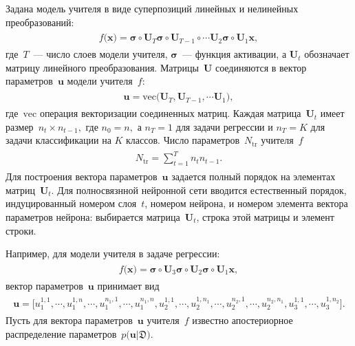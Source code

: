 \documentclass[12pt]{a&t}
\begin{document}
Задана модель учителя в виде суперпозиций линейных и нелинейных преобразований:
\begin{gather}
\label{eq:st:2}
\begin{aligned}
f\bigr(\mathbf{x}\bigr) = \bm{\sigma} \circ \mathbf{U}_T \bm{\sigma} \circ \mathbf{U}_{T-1}\circ \cdots  \mathbf{U}_2\bm{\sigma} \circ \mathbf{U}_1\mathbf{x},
\end{aligned}
\end{gather}
где~$T$~--- число слоев модели учителя, $\bm{\sigma}$~--- функция активации, а $\mathbf{U}_t$ обозначает матрицу линейного преобразования. Матрицы~$\mathbf{U}$ соединяются в вектор параметров~$\mathbf{u}$ модели учителя~$f$:
\begin{gather}
\label{eq:st:2.1}
\begin{aligned}
\mathbf{u} = \text{vec}\bigr(\mathbf{U}_T, \mathbf{U}_{T-1}, \cdots \mathbf{U}_1\bigr),
\end{aligned}
\end{gather}
где~$\text{vec}$ операция векторизации соединенных матриц.
Каждая матрица~$\mathbf{U}_t$ имеет размер~$n_t\times n_{t-1},$ где $n_0=n,$ а  $n_T={1}$ для задачи регрессии и $n_T=K$ для задачи классификации на $K$ классов. Число параметров~$N_{\text{tr}}$ учителя~$f$
\begin{gather}
\label{eq:st:2.2}
\begin{aligned}
N_{\text{tr}} = \sum_{t=1}^{T}n_tn_{t-1}.
\end{aligned}
\end{gather}
Для построения вектора параметров~$\mathbf{u}$ задается полный порядок на элементах матриц~$\mathbf{U}_t$. Для полносвязнной нейронной сети вводится естественный порядок, индуцированный номером слоя~$t$, номером нейрона, и номером элемента вектора параметров нейрона: выбирается матрица~$\mathbf{U}_t$, строка этой матрицы и элемент строки.

Например, для модели учителя в задаче регрессии:
\begin{gather}
\label{eq:st:3}
\begin{aligned}
f\bigr(\mathbf{x}\bigr) = \bm{\sigma} \circ \mathbf{U}_3 \bm{\sigma} \circ \mathbf{U}_2\bm{\sigma}\circ \mathbf{U}_1\mathbf{x},
\end{aligned}
\end{gather}
вектор параметров~$\mathbf{u}$ принимает вид
\begin{gather}
\label{eq:st:4}
\begin{aligned}
\mathbf{u} = \bigr[u_1^{1,1}, \cdots, u_1^{1,n},
                                               \cdots, 
                             u_1^{n_1,1}, \cdots, u_1^{n_1,n},  
                             u_2^{1, 1}, \cdots, u_2^{1, n_1}, 
                                                \cdots, 
                            u_2^{n_2, 1}, \cdots, u_2^{n_2, n_1},
                            u_3^{1, 1}, \cdots, u_3^{1, n_2}\bigr].
\end{aligned}
\end{gather}
Пусть для вектора параметров~$\mathbf{u}$ учителя~$f$ известно апостериорное распределение параметров~$p\bigr(\mathbf{u}|\mathfrak{D}\bigr)$.
\end{document}
